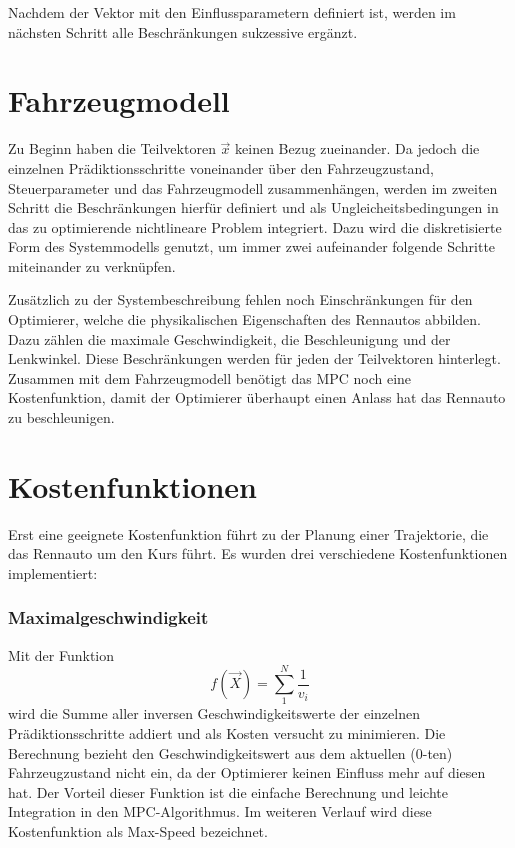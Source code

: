 \documentclass{like}
\begin{document}
  

Nachdem der Vektor mit den Einflussparametern definiert ist, werden im nächsten Schritt alle Beschränkungen sukzessive ergänzt.

\section{Fahrzeugmodell}
Zu Beginn haben die Teilvektoren $\vec{x}$ keinen Bezug zueinander. Da jedoch die einzelnen Prädiktionsschritte voneinander über den Fahrzeugzustand, Steuerparameter und das Fahrzeugmodell zusammenhängen, werden im zweiten Schritt die Beschränkungen hierfür definiert und als Ungleicheitsbedingungen in das zu optimierende nichtlineare Problem integriert. Dazu wird die diskretisierte Form des Systemmodells genutzt, um immer zwei aufeinander folgende Schritte miteinander zu verknüpfen. 

Zusätzlich zu der Systembeschreibung fehlen noch Einschränkungen für den Optimierer, welche die physikalischen Eigenschaften des Rennautos abbilden.
Dazu zählen die ma\-xi\-male Geschwindigkeit, die Beschleunigung und der Lenkwinkel. Diese Beschränkungen werden für jeden der Teilvektoren hinterlegt. Zusammen mit dem Fahrzeugmodell benötigt das \ac{MPC} noch eine Kostenfunktion, damit der Optimierer überhaupt einen Anlass hat das Rennauto zu beschleunigen.


\section{Kostenfunktionen}
\label{costFunctions}
Erst eine geeignete Kostenfunktion führt zu der Planung einer Trajektorie, die das Rennauto um den Kurs führt. Es wurden drei verschiedene Kostenfunktionen implementiert:

\subsubsection*{Maximalgeschwindigkeit}  
Mit der Funktion 
\begin{equation}
	f(\vec{X}) =  \sum_{1}^{N} \frac{1}{v_i}
\end{equation}
wird die Summe aller inversen Geschwindigkeitswerte der einzelnen Prädiktionsschritte addiert und als Kosten versucht zu minimieren.
Die Berechnung bezieht den Ge\-schwin\-dig\-keits\-wert aus dem aktuellen (0-ten) Fahrzeugzustand nicht ein, da der Optimierer keinen Einfluss mehr auf diesen hat. Der Vorteil dieser Funktion ist die einfache Berechnung und leichte Integration in den \ac{MPC}-Algorithmus. Im weiteren Verlauf wird diese Kostenfunk\-ti\-on als Max-Speed bezeichnet.
\end{document}
